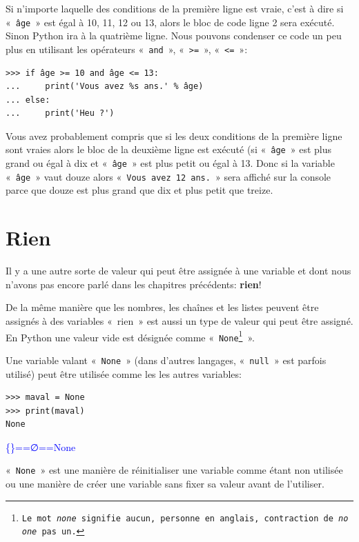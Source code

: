 Si n'importe laquelle des conditions de la première ligne est vraie, c'est à dire si  «~\texttt{âge}~» est égal à 10, 11, 12 ou 13, alors le bloc de code ligne 2 sera exécuté. Sinon Python ira à la quatrième ligne. 
Nous pouvons condenser ce code un peu plus en utilisant les opérateurs «~\texttt{and}~», «~\texttt{>=}~», «~\texttt{<=}~»:

\begin{Verbatim}[frame=single,rulecolor=\color{green}, label=à taper avec attention]
>>> if âge >= 10 and âge <= 13:
...     print('Vous avez %s ans.' % âge)
... else:
...     print('Heu ?')
\end{Verbatim}

Vous avez probablement compris que si les deux conditions de la première ligne sont vraies alors le bloc de la deuxième ligne est exécuté (si «~\texttt{âge}~»  est plus grand ou égal à dix et «~\texttt{âge}~» est plus petit ou égal à 13. Donc si la variable «~\texttt{âge}~» vaut douze alors «~\texttt{Vous avez 12 ans.}~» sera affiché sur la console parce que douze est plus grand que dix et plus petit que treize.

\section{Rien}
Il y a une autre sorte de valeur qui peut être assignée à une variable et dont nous n'avons pas encore parlé dans les chapitres précédents: \textbf{rien}!

De la même manière que les nombres, les chaînes et les listes peuvent être assignés à des variables «~{rien}~»   est aussi un type de valeur qui peut être assigné. En Python une valeur vide est désignée comme «~\texttt{None\footnote{Le mot \emph{none} signifie aucun, personne en anglais, contraction de \emph{no one} pas un.}}~».

Une variable valant «~\texttt{None}~» (dans d'autres langages, «~\texttt{null}~» est parfois utilisé) peut être utilisée comme les les autres variables:

\begin{Verbatim}[frame=single,rulecolor=\color{mbleu}, label=à taper]
>>> maval = None
>>> print(maval)
None
\end{Verbatim}

\begin{center}
\textcolor{blue}{\textrm{\{\}==∅==None}}
\end{center}

«~\texttt{None}~» est une manière de réinitialiser une variable comme étant non utilisée ou une manière de créer une variable sans fixer sa valeur avant de l'utiliser.

